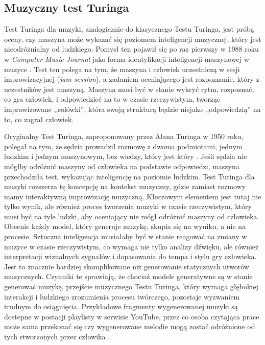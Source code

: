 \documentclass[data-science]{agh-wi} %
\begin{document}
\subsection{Muzyczny test Turinga}
Test Turinga dla muzyki, analogicznie do klasycznego Testu Turinga, jest próbą oceny, czy maszyna może wykazać się poziomem inteligencji muzycznej, który jest nieodróżnialny od ludzkiego. Pomysł ten pojawił się po raz pierwszy w 1988 roku w \textit{Computer Music Journal} jako forma identyfikacji inteligencji maszynowej w muzyce \cite{music_turing_test}. Test ten polega na tym, że maszyna i człowiek uczestniczą w sesji improwizacyjnej (\textit{jam session}), a zadaniem oceniającego jest rozpoznanie, który z uczestników jest maszyną. Maszyna musi być w stanie wykryć rytm, rozpoznać, co gra człowiek, i odpowiedzieć na to w czasie rzeczywistym, tworząc improwizowane ,,solówki'', która swoją strukturą będzie niejako ,,odpowiedzią'' na to, co zagrał człowiek.

Oryginalny Test Turinga, zaproponowany przez Alana Turinga w 1950 roku, polegał na tym, że sędzia prowadził rozmowę z dwoma podmiotami, jednym ludzkim i jednym maszynowym, bez wiedzy, który jest który \cite{turing_test}. Jeśli sędzia nie mógłby odróżnić maszyny od człowieka na podstawie odpowiedzi, maszyna przechodziła test, wykazując inteligencję na poziomie ludzkim. Test Turinga dla muzyki rozszerza tę koncepcję na kontekst muzyczny, gdzie zamiast rozmowy mamy interaktywną improwizację muzyczną. Kluczowym elementem jest tutaj nie tylko wynik, ale również proces tworzenia muzyki w czasie rzeczywistym, który musi być na tyle ludzki, aby oceniający nie mógł odróżnić maszyny od człowieka. Obecnie każdy model, który generuje muzykę, skupia się na wyniku, a nie na procesie. Sztuczna inteligencja musiałaby być w stanie reagować na zmiany w muzyce w czasie rzeczywistym, co wymaga nie tylko analizy dźwięku, ale również interpretacji wizualnych sygnałów i dopasowania do tempa i stylu gry człowieka. Jest to znacznie bardziej skomplikowane niż generowanie statycznych utworów muzycznych. Czynniki te sprawiają, że chociaż modele generatywne są w stanie generować muzykę, przejście muzycznego Testu Turinga, który wymaga głębokiej interakcji i ludzkiego zrozumienia procesu twórczego, pozostaje wyzwaniem trudnym do osiągnięcia. Przykładowe fragmenty wygenerowanej muzyki są dostepne w postacji playlisty w serwisie YouTube, przez co osoba czytająca prace może sama przekonać się czy wygenerowane melodie mogą zostać odróżnione od tych stworzonych przez człowika \cite*{playlist}.
\end{document}
